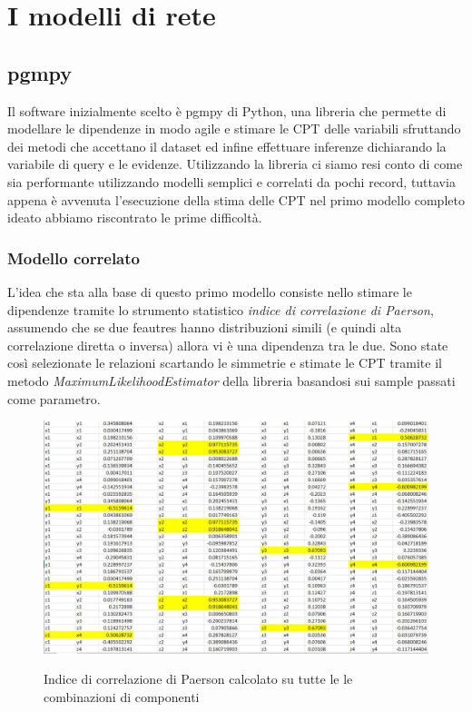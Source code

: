 \documentclass[12pt]{article}
\begin{document}
\section{I modelli di rete}
\subsection{pgmpy}
Il software inizialmente scelto è pgmpy\cite{pgmpy} di Python, una libreria che permette di modellare le dipendenze in modo agile e stimare le CPT delle variabili sfruttando dei metodi che accettano il dataset ed infine effettuare inferenze dichiarando la variabile di query e le evidenze. \linebreak
Utilizzando la libreria ci siamo resi conto di come sia performante utilizzando modelli semplici e correlati da pochi record, tuttavia appena è avvenuta l'esecuzione della stima delle CPT nel primo modello completo ideato abbiamo riscontrato le prime difficoltà.

\subsubsection{Modello correlato}
L'idea che sta alla base di questo primo modello consiste nello stimare le dipendenze tramite lo strumento statistico \emph{indice di correlazione di Paerson}, assumendo che se due feautres hanno distribuzioni simili (e quindi alta correlazione diretta o inversa) allora vi è una dipendenza tra le due. Sono state così selezionate le relazioni scartando le simmetrie e stimate le CPT tramite il metodo \emph{MaximumLikelihoodEstimator} della libreria basandosi sui sample passati come parametro. \newline

\begin{figure}[H]
	\centering
	{\includegraphics[width=1\textwidth]{images/corr05.JPG}}
	\caption{Indice di correlazione di Paerson calcolato su tutte le le combinazioni di componenti}
	\label{fig:corr}
\end{figure}
\end{document}
